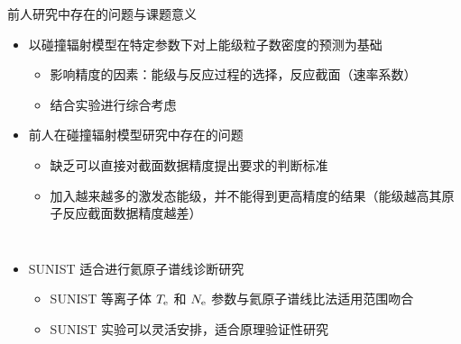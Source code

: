 \begin{CJK*}{UTF8}{kai}
\begin{frame}{前人研究中存在的问题与课题意义}
	\begin{itemize}
		\item 以碰撞辐射模型在特定参数下对上能级粒子数密度的预测为基础
			\begin{itemize}
				\item 影响精度的因素：能级与反应过程的选择，反应截面（速率系数）
				\item 结合实验进行综合考虑%
			\end{itemize}
		\item 前人在碰撞辐射模型研究中存在的问题
			\begin{itemize}
				\item 缺乏可以直接对截面数据精度提出要求的判断标准%
				\item 加入越来越多的激发态能级，并不能得到更高精度的结果（能级越高其原子反应截面数据精度越差）
			\end{itemize}
	\end{itemize}
	\vspace{-1.2em}
	\pause
	\begin{columns}
	\begin{itemize}
		\item SUNIST 适合进行氦原子谱线诊断研究
			\begin{itemize}
				\item SUNIST 等离子体 $T_{\rm e}$ 和 $N_{\rm e}$ 参数与氦原子谱线比法适用范围吻合
				\item SUNIST 实验可以灵活安排，适合原理验证性研究
			\end{itemize}
	\end{itemize}
\end{columns}
\end{frame}
\end{CJK*}
